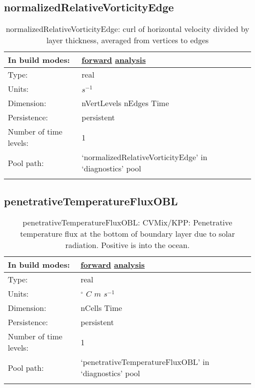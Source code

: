 \subsection[normalizedRelativeVorticityEdge]{normalizedRelativeVorticityEdge}
\label{subsec:var_sec_diagnostics_normalizedRelativeVorticityEdge}
\begin{center}
\begin{longtable}{| p{2.0in} | p{4.0in} |}
        \hline 
        In build modes: & \hyperref[subsec:forward_var_tab_diagnostics]{forward} \hyperref[subsec:analysis_var_tab_diagnostics]{analysis} \\
        \hline 
        Type: & real \\
        \hline 
        Units: & $s^{-1}$ \\
        \hline 
        Dimension: & nVertLevels nEdges Time \\
        \hline 
        Persistence: & persistent \\
        \hline 
        Number of time levels: & 1 \\
        \hline 
            Pool path: & `normalizedRelativeVorticityEdge' in `diagnostics' pool \\
		 \hline 
    \caption{normalizedRelativeVorticityEdge: curl of horizontal velocity divided by layer thickness, averaged from vertices to edges}
\end{longtable}
\end{center}
\subsection[penetrativeTemperatureFluxOBL]{penetrativeTemperatureFluxOBL}
\label{subsec:var_sec_diagnostics_penetrativeTemperatureFluxOBL}
\begin{center}
\begin{longtable}{| p{2.0in} | p{4.0in} |}
        \hline 
        In build modes: & \hyperref[subsec:forward_var_tab_diagnostics]{forward} \hyperref[subsec:analysis_var_tab_diagnostics]{analysis} \\
        \hline 
        Type: & real \\
        \hline 
        Units: & $^\circ$ $C$ $m$ $s^{-1}$ \\
        \hline 
        Dimension: & nCells Time \\
        \hline 
        Persistence: & persistent \\
        \hline 
        Number of time levels: & 1 \\
        \hline 
            Pool path: & `penetrativeTemperatureFluxOBL' in `diagnostics' pool \\
		 \hline 
    \caption{penetrativeTemperatureFluxOBL: CVMix/KPP: Penetrative temperature flux at the bottom of boundary layer due to solar radiation. Positive is into the ocean.}
\end{longtable}
\end{center}
